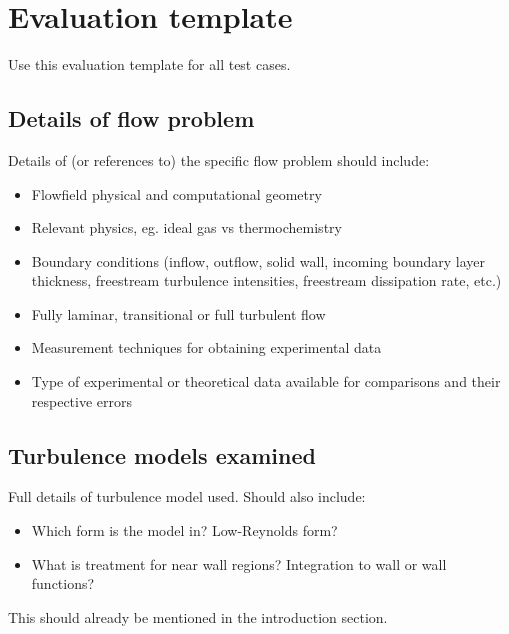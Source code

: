 
\newpage
\section{Evaluation template}
%
Use this evaluation template for all test cases.

\subsection{Details of flow problem}
%
Details of (or references to) the specific flow problem should include:
\begin{itemize}
\item Flowfield physical and computational geometry
\item Relevant physics, eg. ideal gas vs thermochemistry
\item Boundary conditions (inflow, outflow, solid wall, incoming boundary
      layer thickness, freestream turbulence intensities, freestream
      dissipation rate, etc.)
\item Fully laminar, transitional or full turbulent flow
\item Measurement techniques for obtaining experimental data
\item Type of experimental or theoretical data available for comparisons
      and their respective errors
\end{itemize}

\subsection{Turbulence models examined}
%
Full details of turbulence model used. Should also include:
\begin{itemize}
\item Which form is the model in? Low-Reynolds form?
\item What is treatment for near wall regions?
      Integration to wall or wall functions?
\end{itemize}

\medskip
This should already be mentioned in the introduction section.

